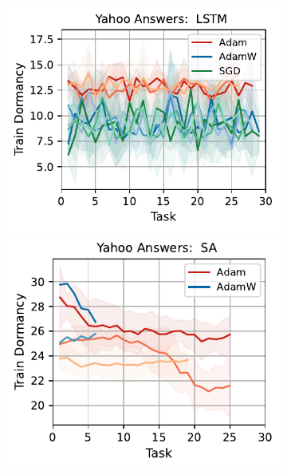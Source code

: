 \begin{figure}[htb!]
{\begin{figure}[htb!]
{        \includegraphics[width=\textwidth]{figs/Dormancy/nlp/lstm/yahoo_answers_50.pdf}
        \includegraphics[width=\textwidth]{figs/Dormancy/nlp/attention/yahoo_answers_40.pdf}
}
\end{figure}}
\end{figure}

